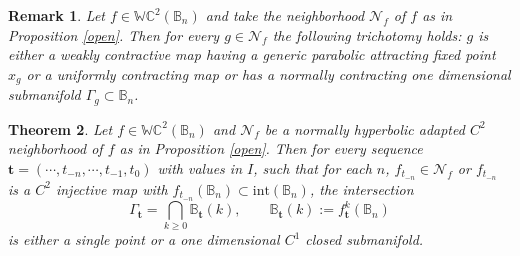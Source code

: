 \documentclass[11pt,reqno]{amsart}
\theoremstyle{plain}
\newtheorem{theorem}{Theorem}[section]
\newtheorem{remark}[theorem]{Remark}
\newtheorem*{theorem A}{Theorem A}
\newtheorem*{theorem B}{Theorem B}
\newtheorem*{theorem C}{Theorem C}
\newtheorem*{theorem 1}{Theorem 1}
\newtheorem*{theorem 2}{Theorem 2}
\newtheorem*{theorem 3}{Theorem 3}
\numberwithin{equation}{section}
\begin{document}
\begin{remark}\label{p1}
Let $f\in\mathbb{WC}^2 ( \mathbb{B}_n)$ and take the neighborhood $\mathcal{N}_f$ of $f$ as in Proposition \ref{open}.
Then for every $g \in \mathcal{N}_f$ the following trichotomy holds: $g$ is either a weakly contractive map having a generic parabolic attracting fixed point $x_g$ or a uniformly contracting map or has a normally contracting one dimensional submanifold $\Gamma_g\subset \mathbb{B}_n$.
\end{remark}

\begin{theorem}\label{open2}
Let $f\in\mathbb{WC}^2 ( \mathbb{B}_n)$ and $\mathcal{N}_f$ be a normally hyperbolic adapted $C^2$ neighborhood of $f$ as in Proposition \ref{open}.
Then for every sequence $\mathbf{t}=(\cdots, t_{-n}, \cdots, t_{-1}, t_0)$ with values in $I$, such that for each $n$, $f_{t_{-n}} \in \mathcal{N}_f$ or $f_{t_{-n}}$ is a $C^2$ injective map with $f_{t_{-n}}(\mathbb{B}_n)\subset \text{int}(\mathbb{B}_n)$, the intersection
\begin{equation*}
\Gamma_{\mathbf{t}}= \bigcap_{k\ge 0} \mathbb{B}_{\mathbf{t}} (k),
\qquad
\mathbb{B}_{\mathbf{t}} (k) := f^k_{\mathbf{t}} (\mathbb{B}_{n})
\end{equation*}
is either a single point or a one dimensional $C^1$ closed submanifold.
\end{theorem}
\end{document}
